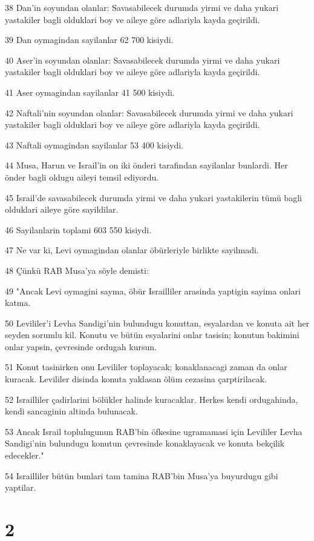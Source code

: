 \par 38 Dan'in soyundan olanlar: Savasabilecek durumda yirmi ve daha yukari yastakiler bagli olduklari boy ve aileye göre adlariyla kayda geçirildi.
\par 39 Dan oymagindan sayilanlar 62 700 kisiydi.
\par 40 Aser'in soyundan olanlar: Savasabilecek durumda yirmi ve daha yukari yastakiler bagli olduklari boy ve aileye göre adlariyla kayda geçirildi.
\par 41 Aser oymagindan sayilanlar 41 500 kisiydi.
\par 42 Naftali'nin soyundan olanlar: Savasabilecek durumda yirmi ve daha yukari yastakiler bagli olduklari boy ve aileye göre adlariyla kayda geçirildi.
\par 43 Naftali oymagindan sayilanlar 53 400 kisiydi.
\par 44 Musa, Harun ve Israil'in on iki önderi tarafindan sayilanlar bunlardi. Her önder bagli oldugu aileyi temsil ediyordu.
\par 45 Israil'de savasabilecek durumda yirmi ve daha yukari yastakilerin tümü bagli olduklari aileye göre sayildilar.
\par 46 Sayilanlarin toplami 603 550 kisiydi.
\par 47 Ne var ki, Levi oymagindan olanlar öbürleriyle birlikte sayilmadi.
\par 48 Çünkü RAB Musa'ya söyle demisti:
\par 49 "Ancak Levi oymagini sayma, öbür Israilliler arasinda yaptigin sayima onlari katma.
\par 50 Levililer'i Levha Sandigi'nin bulundugu konuttan, esyalardan ve konuta ait her seyden sorumlu kil. Konutu ve bütün esyalarini onlar tasisin; konutun bakimini onlar yapsin, çevresinde ordugah kursun.
\par 51 Konut tasinirken onu Levililer toplayacak; konaklanacagi zaman da onlar kuracak. Levililer disinda konuta yaklasan ölüm cezasina çarptirilacak.
\par 52 Israilliler çadirlarini bölükler halinde kuracaklar. Herkes kendi ordugahinda, kendi sancaginin altinda bulunacak.
\par 53 Ancak Israil toplulugunun RAB'bin öfkesine ugramamasi için Levililer Levha Sandigi'nin bulundugu konutun çevresinde konaklayacak ve konuta bekçilik edecekler."
\par 54 Israilliler bütün bunlari tam tamina RAB'bin Musa'ya buyurdugu gibi yaptilar.

\chapter{2}

